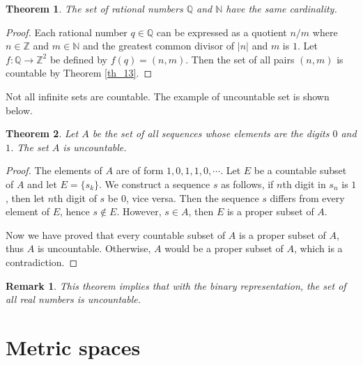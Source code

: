 \documentclass[11pt]{book}
\newtheorem{theorem}{Theorem}[chapter]
\newtheorem{remark}{Remark}[chapter]
\theoremstyle{definition}
\numberwithin{equation}{chapter}
\begin{document}
\medskip

\begin{theorem}
The set of rational numbers $\mathbb{Q}$ and $\mathbb{N}$ have the same cardinality.
\end{theorem}
\begin{proof}
Each rational number $q \in \mathbb{Q}$ can be expressed as a quotient $n/m$ where $n \in \mathbb{Z}$ and $m \in \mathbb{N}$ and the greatest common divisor of $\left|n\right|$ and $m$ is $1$. Let $f: \mathbb{Q} \to \mathbb{Z}^2$ be defined by $f(q) = (n,m)$. Then the set of all pairs $(n,m)$ is countable by Theorem \ref{th_13}.
\end{proof}

\medskip

Not all infinite sets are countable. The example of uncountable set is shown below.

\medskip

\begin{theorem}
Let $A$ be the set of all sequences whose elements are the digits $0$ and $1$. The set $A$ is uncountable.
\end{theorem}
\begin{proof}
The elements of $A$ are of form $1,0,1,1,0,\cdots$. Let $E$ be a countable subset of $A$ and let $E = \{s_k\}$. We construct a sequence $s$ as follows, if $n$th digit in $s_n$ is $1$, then let $n$th digit of $s$ be $0$, vice versa. Then the sequence $s$ differs from every element of $E$, hence $s \notin E$. However, $s \in A$, then $E$ is a proper subset of $A$.

Now we have proved that every countable subset of $A$ is a proper subset of $A$, thus $A$ is uncountable. Otherwise, $A$ would be a proper subset of $A$, which is a contradiction. 
\end{proof}

\begin{remark}
This theorem implies that with the binary representation, the set of all real numbers is uncountable.
\end{remark}

\medskip


\section{Metric spaces}
\end{document}
